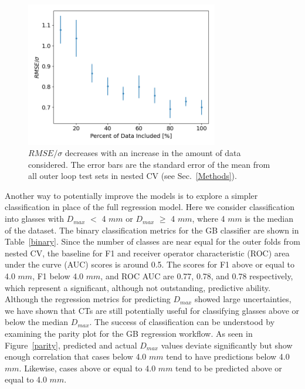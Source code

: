 \documentclass[11pt,a4paper]{article}
\begin{document}
\begin{figure}[H]
\centering
\includegraphics[width=0.75\textwidth]{figures/RMSE_sigma.png}
\caption{$RMSE/\sigma$ decreases with an increase in the amount of data considered. The error bars are the standard error of the mean from all outer loop test sets in nested CV (see Sec.~\ref{Methods}).}
\label{learning_curve}
\end{figure}

\par
Another way to potentially improve the models is to explore a simpler classification in place of the full regression model. Here we consider classification into glasses with $D_{max}$ $<$ 4 $mm$ or $D_{max}$ $\ge$ 4 $mm$, where 4 $mm$ is the median of the dataset. The binary classification metrics for the GB classifier are shown in Table~\ref{binary}. Since the number of classes are near equal for the outer folds from nested CV, the baseline for F1 and receiver operator characteristic (ROC) area under the curve (AUC) scores is around 0.5. The scores for F1 above or equal to 4.0 $mm$, F1 below 4.0 $mm$, and ROC AUC are 0.77, 0.78, and 0.78 respectively, which represent a significant, although not outstanding, predictive ability. Although the regression metrics for predicting $D_{max}$ showed large uncertainties, we have shown that CTs are still potentially useful for classifying glasses above or below the median $D_{max}$. The success of classification can be understood by examining the parity plot for the GB regression workflow. As seen in Figure~\ref{parity}, predicted and actual $D_{max}$ values deviate significantly but show enough correlation that cases below 4.0 $mm$ tend to have predictions below 4.0 $mm$. Likewise, cases above or equal to 4.0 $mm$ tend to be predicted above or equal to 4.0 $mm$.
\end{document}
